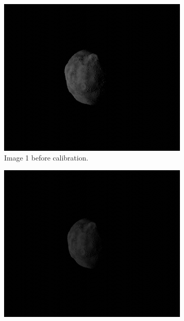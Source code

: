 \begin{figure}[htb]
    \centering
        \begin{subfigure}[b]{0.48\textwidth}
            \centering
                \includegraphics[width=\textwidth]{doc/thesis/0_figures/rendering_lighting/SssbOnly_2017-08-15T115858-281000.jpg}
                \caption{Image 1 before calibration.}
                \label{fig:composition_before_1}
        \end{subfigure}
        \begin{subfigure}[b]{0.48\textwidth}
            \centering
                \includegraphics[width=\textwidth]{doc/thesis/0_figures/rendering_lighting/SssbOnly_2017-08-15T115859-288000.jpg}

\end{subfigure}
\end{figure}

